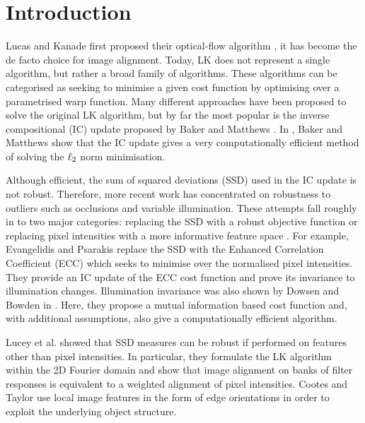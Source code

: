 \section{Introduction}\label{sec:introduction}
 Lucas and Kanade first proposed their optical-flow algorithm \cite{RefWorks:71}, it has become the de facto choice for image alignment. Today, LK does not represent a single algorithm, but rather a broad family of algorithms. These algorithms can be categorised as seeking to minimise a given cost function by optimising over a parametrised warp function. Many different approaches have been proposed to solve the original LK algorithm, but by far the most popular is the inverse compositional (IC) update proposed by Baker and Matthews \cite{RefWorks:10}. In \cite{RefWorks:10}, Baker and Matthews show that the IC update gives a very computationally efficient method of solving the $\ell_2$ norm minimisation. 

Although efficient, the sum of squared deviations (SSD) used in the IC update is not robust. Therefore, more recent work has concentrated on robustness to outliers such as occlusions and variable illumination. These attempts fall roughly in to two major categories: replacing the SSD with a robust objective function \cite{RefWorks:59, RefWorks:72, RefWorks:53, RefWorks:274} or replacing pixel intensities with a more informative feature space \cite{RefWorks:73, RefWorks:6, RefWorks:273}. For example, Evangelidis and Psarakis \cite{RefWorks:59} replace the SSD with the Enhanced Correlation Coefficient (ECC) which seeks to minimise over the normalised pixel intensities. They provide an IC update of the ECC cost function and prove its invariance to illumination changes. Illumination invariance was also shown by Dowsen and Bowden in \cite{RefWorks:72}. Here, they propose a mutual information based cost function and, with additional assumptions, also give a computationally efficient algorithm. 

Lucey et al. \cite{RefWorks:67, RefWorks:73} showed that SSD measures can be robust if performed on features other than pixel intensities. In particular, they formulate the LK algorithm within the 2D Fourier domain and show that image alignment on banks of filter responses is equivalent to a weighted alignment of pixel intensities. Cootes and Taylor \cite{RefWorks:273} use local image features in the form of edge orientations in order to exploit the underlying object structure.

